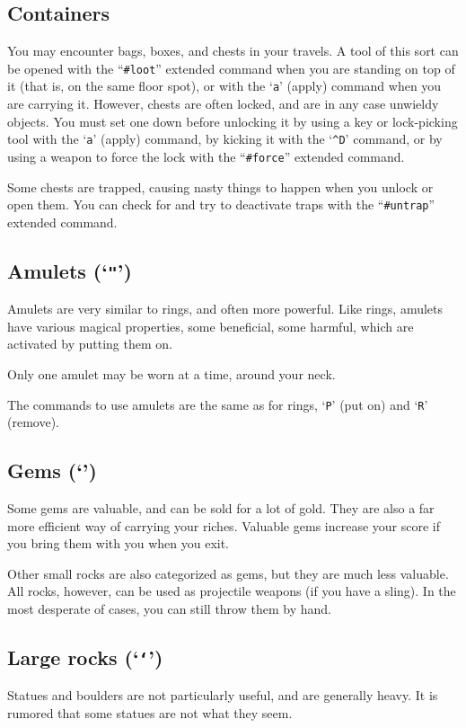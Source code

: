 \subsection*{Containers}

You may encounter bags, boxes, and chests in your travels.  A tool of
this sort can be opened with the ``{\tt \#loot}'' extended command when
you are standing on top of it (that is, on the same floor spot),
or with the `{\tt a}' (apply) command when you are carrying it.  However,
chests are often locked, and are in any case unwieldy objects.
You must set one down before unlocking it by
using a key or lock-picking tool with the `{\tt a}' (apply) command,
by kicking it with the `{\tt \^{}D}' command,
or by using a weapon to force the lock with the ``{\tt \#force}''
extended command.

Some chests are trapped, causing nasty things to happen when you
unlock or open them.  You can check for and try to deactivate traps
with the ``{\tt \#untrap}'' extended command.

\subsection*{Amulets (`{\tt "}')}

Amulets are very similar to rings, and often more powerful.  Like
rings, amulets have various magical properties, some beneficial,
some harmful, which are activated by putting them on.

Only one amulet may be worn at a time, around your neck.

The commands to use amulets are the same as for rings, `{\tt P}' (put on)
and `{\tt R}' (remove).

\subsection*{Gems (`{\tt *}')}

Some gems are valuable, and can be sold for a lot of gold.  They are also
a far more efficient way of carrying your riches.  Valuable gems increase
your score if you bring them with you when you exit.

Other small rocks are also categorized as gems, but they are much less
valuable.  All rocks, however, can be used as projectile weapons (if you
have a sling).  In the most desperate of cases, you can still throw them
by hand.

\subsection*{Large rocks (`{\tt `}')}
Statues and boulders are not particularly useful, and are generally
heavy.  It is rumored that some statues are not what they seem.


